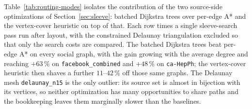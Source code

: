 \documentclass[a4paper,USenglish,anonymous]{gd-lipics-v3}
\begin{document}
Table~\ref{tab:routing-modes} isolates the contribution of the two
source-side optimizations of Section~\ref{sec:sleeve}: batched Dijkstra
trees over per-edge A* and the vertex-cover heuristic on top of that.
Each row times a single sleeve-search pass run after layout, with the
constrained Delaunay triangulation excluded so that only the search
costs are compared. The batched Dijkstra trees beat per-edge A* on
every social graph, with the gain growing with the average degree and
reaching $+63$\,\% on \texttt{facebook\_combined} and $+48$\,\% on
\texttt{ca-HepPh}; the vertex-cover heuristic then shaves a further
$11$--$42$\,\% off those same graphs. The Delaunay mesh
\texttt{delaunay\_n15} is the only outlier: its source set is almost
in bijection with its vertices, so neither optimization has many
opportunities to share paths and the bookkeeping leaves them
marginally slower than the baselines.
\end{document}
